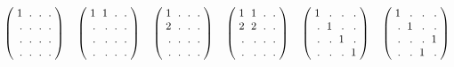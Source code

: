 \documentclass[12pt,a4paper]{amsart}
\begin{document}
\begin{align*}\arraycolsep3pt
\left(\begin{array}{rrrr}
1&.&.&.\\
.&.&.&.\\
.&.&.&.\\
.&.&.&.\\
\end{array}\right)
\quad
\left(\begin{array}{rrrr}
1&1&.&.\\
.&.&.&.\\
.&.&.&.\\
.&.&.&.\\
\end{array}\right)
\quad
\left(\begin{array}{rrrr}
1&.&.&.\\
2&.&.&.\\
.&.&.&.\\
.&.&.&.\\
\end{array}\right)
\quad
\left(\begin{array}{rrrr}
1&1&.&.\\
2&2&.&.\\
.&.&.&.\\
.&.&.&.\\
\end{array}\right)
\quad
\left(\begin{array}{rrrr}
1&.&.&.\\
.&1&.&.\\
.&.&1&.\\
.&.&.&1\\
\end{array}\right)
\quad
\left(\begin{array}{rrrr}
1&.&.&.\\
.&1&.&.\\
.&.&.&1\\
.&.&1&.\\
\end{array}\right)
\end{align*}
\end{document}
